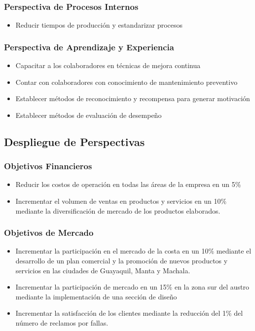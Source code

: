 \documentclass[12pt, a4paper]{article}
\begin{document}
	\subsubsection{Perspectiva de Procesos Internos}
	\begin{itemize}	
	\item Reducir tiempos de producción y estandarizar procesos
		\end{itemize}
		
	\subsubsection{Perspectiva de Aprendizaje y Experiencia}
	\begin{itemize}	
		\item Capacitar a los colaboradores en técnicas de mejora continua
		\item Contar con colaboradores con conocimiento de mantenimiento preventivo
		\item Establecer métodos de reconocimiento y recompensa para generar motivación
		\item Establecer métodos de evaluación de desempeño
	\end{itemize}
	
	\subsection{Despliegue de Perspectivas}
	\subsubsection{Objetivos Financieros}
	\begin{itemize}	
		\item Reducir los costos de operación en todas las áreas de la empresa en un 5\%
		\item Incrementar el volumen de ventas en productos y servicios en un 10\% mediante la diversificación de mercado de los productos elaborados.
	\end{itemize}
	
	
	\subsubsection{Objetivos de Mercado}
	\begin{itemize}	
		\item Incrementar la participación en el mercado de la costa en un 10\% mediante el desarrollo de un plan comercial y la promoción de nuevos productos y servicios en las ciudades de Guayaquil, Manta y Machala.
		\item Incrementar la participación de mercado en un 15\% en la zona sur del austro mediante la implementación de una sección de diseño
		\item Incrementar la satisfacción de los clientes mediante la reducción del 1\% del número de reclamos por fallas. 
	\end{itemize}
	
\end{document}
